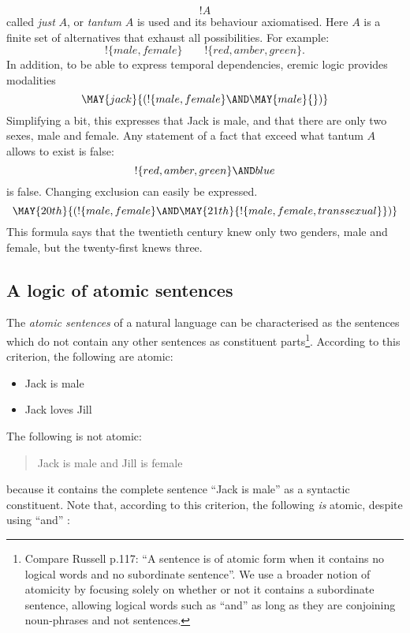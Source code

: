 \[
   !A
\]
called \emph{just} $A$, or \emph{tantum} $A$ is used and its behaviour
axiomatised. Here $A$ is a finite set of alternatives that exhaust all
possibilities. For example:
\[
   !\{male, female\}
      \qquad
   !\{red, amber, green\}.
\]
In addition, to be able to express temporal dependencies, eremic logic provides modalities
\[
   \MAY{jack}{(!\{male, female\} \AND \MAY{male}{})}
\]
Simplifying a bit, this expresses that Jack is male, and that there
are only two sexes, male and female.  Any statement of a fact that
exceed what tantum $A$ allows to exist is false:
\[
   !\{red, amber, green\} \AND blue
\]
is false.
Changing exclusion can easily be expressed.
\[
     \MAY{20th}{(
       !\{male, female\} \AND
       \MAY{21th}{
         !\{male, female, transsexual\}{}} )} 
\]
This formula says that the twentieth century knew only two genders,
male and female, but the twenty-first knews three.




\subsection{A logic of atomic sentences}

\NI The \emph{atomic sentences} of a natural language can be
characterised as the sentences which do not contain any other
sentences as constituent parts\footnote{Compare Russell \cite{russell}
  p.117: ``A sentence is of atomic form when it contains no logical
  words and no subordinate sentence''. We use a broader notion of
  atomicity by focusing solely on whether or not it contains a
  subordinate sentence, allowing logical words such as ``and'' as long
  as they are conjoining noun-phrases and not sentences.}.  According
to this criterion, the following are atomic:

\begin{itemize}

\item Jack is male
\item Jack loves Jill
\end{itemize}

\NI The following is not atomic:

\begin{quote}
  Jack is male and Jill is female
\end{quote}

\NI because it contains the complete sentence ``Jack is male'' as a
syntactic constituent.  Note that, according to this criterion, the
following \emph{is} atomic, despite using ``and'' :

